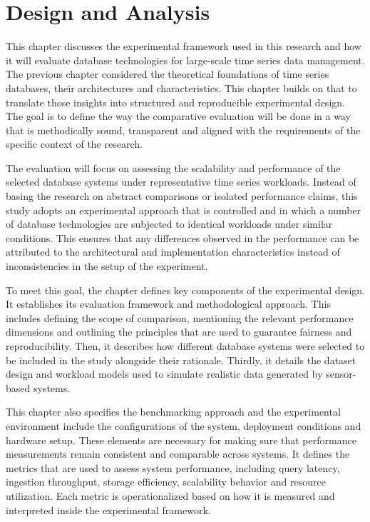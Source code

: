 \chapter{Design and Analysis}
\label{chap:design}

This chapter discusses the experimental framework used in this research and how it will evaluate database technologies for large-scale time series data management. The previous chapter considered the theoretical foundations of time series databases, their architectures and characteristics. This chapter builds on that to translate those insights into structured and reproducible experimental design. The goal is to define the way the comparative evaluation will be done in a way that is methodically sound, transparent and aligned with the requirements of the specific context of the research. 

The evaluation will focus on assessing the scalability and performance of the selected database systems under representative time series workloads. Instead of basing the research on abstract comparisons or isolated performance claims, this study adopts an experimental approach that is controlled and in which a number of database technologies are subjected to identical workloads under similar conditions. This ensures that any differences observed in the performance can be attributed to the architectural and implementation characteristics instead of inconsistencies in the setup of the experiment. 

To meet this goal, the chapter defines key components of the experimental design. It establishes its evaluation framework and methodological approach. This includes defining the scope of comparison, mentioning the relevant performance dimensions and outlining the principles that are used to guarantee fairness and reproducibility. Then, it describes how different database systems were selected to be included in the study alongside their rationale. Thirdly, it details the dataset design and workload models used to simulate realistic data generated by sensor-based systems. 

This chapter also specifies the benchmarking approach and the experimental environment include the configurations of the system, deployment conditions and hardware setup. These elements are necessary for making sure that performance measurements remain consistent and comparable across systems. It defines the metrics that are used to assess system performance, including query latency, ingestion throughput, storage efficiency, scalability behavior and resource utilization. Each metric is operationalized based on how it is measured and interpreted inside the experimental framework. 


